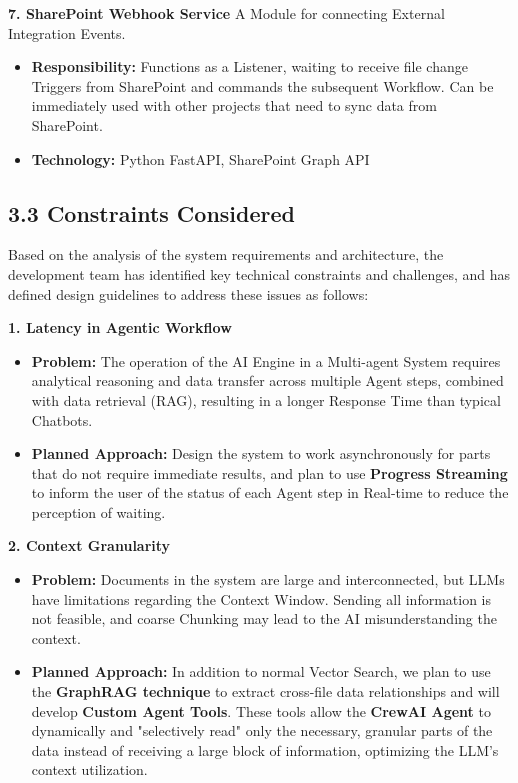 \documentclass[12pt]{article}
\begin{document}
\textbf{7. SharePoint Webhook Service}
A Module for connecting External Integration Events.
\begin{itemize}
    \item \textbf{Responsibility:} Functions as a Listener, waiting to receive file change Triggers from SharePoint and commands the subsequent Workflow. Can be immediately used with other projects that need to sync data from SharePoint.
    \item \textbf{Technology:} Python FastAPI, SharePoint Graph API
\end{itemize}

\subsection{3.3 Constraints Considered}
Based on the analysis of the system requirements and architecture, the development team has identified key technical constraints and challenges, and has defined design guidelines to address these issues as follows:

\textbf{1. Latency in Agentic Workflow}
\begin{itemize}
    \item \textbf{Problem:} The operation of the AI Engine in a Multi-agent System requires analytical reasoning and data transfer across multiple Agent steps, combined with data retrieval (RAG), resulting in a longer Response Time than typical Chatbots.
    \item \textbf{Planned Approach:} Design the system to work asynchronously for parts that do not require immediate results, and plan to use \textbf{Progress Streaming} to inform the user of the status of each Agent step in Real-time to reduce the perception of waiting.
\end{itemize}

\textbf{2. Context Granularity}
\begin{itemize}
    \item \textbf{Problem:} Documents in the system are large and interconnected, but LLMs have limitations regarding the Context Window. Sending all information is not feasible, and coarse Chunking may lead to the AI misunderstanding the context.
    \item \textbf{Planned Approach:} In addition to normal Vector Search, we plan to use the \textbf{GraphRAG technique} to extract cross-file data relationships and will develop \textbf{Custom Agent Tools}. These tools allow the \textbf{CrewAI Agent} to dynamically and "selectively read" only the necessary, granular parts of the data instead of receiving a large block of information, optimizing the LLM's context utilization.
\end{itemize}
\end{document}
